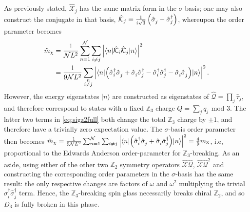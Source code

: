 \documentclass[prb,aps, twocolumn, superscriptaddress]{revtex4-1}
\newcommand{\tmod}[1]{\,\text{mod $#1$}}
\def\ket#1{{|#1\rangle}}
\def\bra#1{{\langle #1 |}}
\begin{document}
\begin{appendix}
As previously stated, ${\hat{\mathcal{X}}}_j$ has the same matrix form in the $\sigma$-basis; one may also construct the conjugate in that basis, ${\hat{\mathcal{K}}}_j = \frac{1}{i \sqrt{3} } \left( {\hat{\sigma}}^{\vphantom{\dagger}}_j - {\hat{\sigma}}^{\dagger}_j \right)$, whereupon the order parameter becomes
\begin{align}
\tilde{m}_{\chi} &= \frac{1}{\mathcal{N}L^2} \sum_{n=1}^{\mathcal{N}} \sum_{i\neq j} \left| \bra{n} {\hat{\mathcal{K}}}_i {\hat{\mathcal{K}}}_j \ket{n}\right|^2 \\
&= \frac{1}{9 \mathcal{N}L^2} \sum_{\substack{n \\ i \neq j}} \left|\bra{n} {  \left( {\hat{\sigma}}^{\dagger}_i {\hat{\sigma}}^{\vphantom{\dagger}}_j  +  {\hat{\sigma}}^{\vphantom{\dagger}}_i {\hat{\sigma}}^{\dagger}_j  - {\hat{\sigma}}^{\dagger}_i {\hat{\sigma}}^{\dagger}_j -  {\hat{\sigma}}^{\vphantom{\dagger}}_i  {\hat{\sigma}}^{\vphantom{\dagger}}_j   \right)}\ket{n}\right|^2  .\label{eq:sigz2full}
\end{align}
However, the energy eigenstates $\ket{n}$ are constructed as eigenstates of ${\hat{\mathcal{Q}}} = \prod_j {\hat{\tau}}_j$, and therefore correspond to states with a fixed $\mathbb{Z}_3$ charge $Q= \sum_j q_j ~\tmod{3}$. The latter two terms in \eqref{eq:sigz2full} both change the total $\mathbb{Z}_3$ charge by $\pm 1$, and therefore have a trivially zero expectation value. The $\sigma$-basis order parameter then becomes $\tilde{m}_{\chi} = \frac{1}{9 \mathcal{N}L^2} \sum_{n=1}^{\mathcal{N}}\sum_{i\neq j} \left|\bra{n}{  \left( {\hat{\sigma}}^{\dagger}_i {\hat{\sigma}}^{\vphantom{\dagger}}_j  +  {\hat{\sigma}}^{\vphantom{\dagger}}_i {\hat{\sigma}}^{\dagger}_j\right)}\ket{n}\right|^2 =  \frac{4}{9} m_3$,
i.e, proportional to the Edwards Anderson order-parameter for $\mathbb{Z}_3$-breaking. As an aside, using either of the other two $\mathbb{Z}_2$ symmetry operators ${\hat{\mathcal{X}}\hat{\mathcal{Q}}}$, ${\hat{\mathcal{X}}\hat{\mathcal{Q}}}^2$ and constructing the corresponding order parameters in the $\sigma$-basis has the same result: the only respective changes are factors of $\omega$ and $\omega^2$ multiplying the trivial ${\hat{\sigma}}^{\dagger}_i {\hat{\sigma}}^{\dagger}_j  $ term. Hence, the $\mathbb{Z}_3$-breaking spin glass necessarily breaks chiral $\mathbb{Z}_2$, and so $D_3$ is fully broken in this phase. 





\end{appendix}
\end{document}
